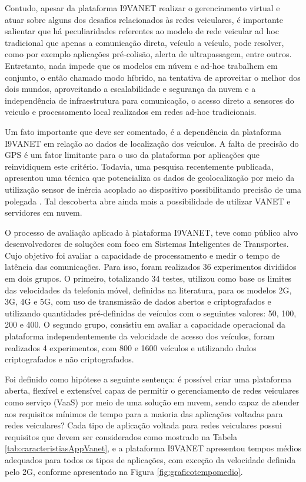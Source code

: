 \documentclass[
	12pt,				%
	oneside,			%
	a4paper,			%
	english,			%
	brazil				%
	]{abntex2ppgsi}
\begin{document}
Contudo, apesar da plataforma I9VANET realizar o gerenciamento virtual e atuar sobre alguns dos desafios relacionados às redes veiculares, é importante salientar que há peculiaridades referentes ao modelo de rede veicular ad hoc tradicional que apenas a comunicação direta, veículo a veículo, pode resolver, como por exemplo aplicações pré-colisão, alerta de ultrapassagem, entre outros. Entretanto, nada impede que os modelos em núvem e ad-hoc trabalhem em conjunto, o então chamado modo híbrido, na tentativa de aproveitar o melhor dos dois mundos, aproveitando a escalabilidade e segurança da nuvem e a independência de infraestrutura para comunicação, o acesso direto a sensores do veiculo e processamento local realizados em redes ad-hoc tradicionais. 

Um fato importante que deve ser comentado, é a dependência da plataforma I9VANET em relação ao dados de localização dos veículos. A falta de precisão do GPS é um fator limitante para o uso da plataforma por aplicações que reinvidiquem este critério. Todavia, uma pesquisa recentemente publicada, apresentou uma técnica que potencializa os dados de geolocalização por meio da utilização sensor de inércia acoplado ao dispositivo possibilitando precisão de uma polegada \cite{chen2016computationally}. Tal descoberta abre ainda mais a possibilidade de utilizar VANET e servidores em nuvem. 


O processo de avaliação aplicado à plataforma I9VANET, teve como público alvo desenvolvedores de soluções com foco em Sistemas Inteligentes de Transportes. Cujo objetivo foi avaliar a capacidade de processamento e medir o tempo de latência das comunicações. Para isso, foram realizados 36 experimentos divididos em dois  grupos. O primeiro, totalizando 34 testes, utilizou como base os limites das velocidades da telefonia móvel, definidas na literatura, para os modelos 2G, 3G, 4G e 5G, com uso de transmissão de dados abertos e criptografados e utilizando quantidades pré-definidas de veículos com o seguintes valores: 50, 100, 200 e 400. O segundo grupo, consistiu em avaliar a capacidade operacional da plataforma independentemente da velocidade de acesso dos veículos, foram realizados 4 experimentos, com 800 e 1600 veículos e utilizando dados criptografados e não criptografados.

Foi definido como hipótese a seguinte sentença: é possível criar uma plataforma aberta, flexível e extensível capaz de permitir o gerenciamento de redes veiculares como serviço (VaaS) por meio de uma solução em nuvem, sendo capaz de atender aos requisitos mínimos de tempo para a maioria das aplicações voltadas para redes veiculares? Cada tipo de aplicação voltada para redes veiculares possui requisitos que devem ser considerados como mostrado na Tabela \ref{tab:caracteristiasAppVanet}, e a plataforma I9VANET apresentou tempos médios adequados para todos os tipos de aplicações, com exceção da velocidade definida pelo 2G, conforme apresentado na Figura \ref{fig:graficotempomedio}.
\end{document}
